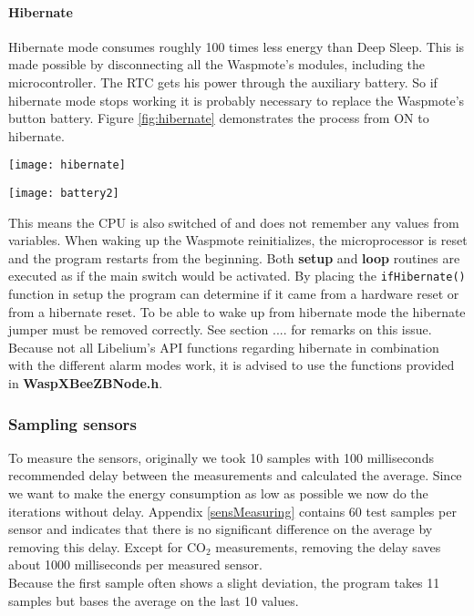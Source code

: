 \paragraph{Hibernate}
Hibernate mode consumes roughly 100 times less energy than Deep Sleep. This is made possible by disconnecting all the Waspmote's modules, including the microcontroller. The RTC gets his power through the auxiliary battery. So if hibernate mode stops working it is probably necessary to replace the Waspmote's button battery. Figure \ref{fig:hibernate} demonstrates the process from ON to hibernate.\\
\begin{figure*}[ht]
\centering
\texttt{[image: hibernate]}
\caption{Waspmote going from ON to Hibernate}
\label{fig:hibernate}
\end{figure*}
\begin{figure*}[!ht]
\centering
\texttt{[image: battery2]}
\caption{Battery life High Performance vs. Power Saver}
\label{fig:batCalcPS}
\end{figure*}
This means the CPU is also switched of and does not remember any values from variables. When waking up the Waspmote reinitializes, the microprocessor is reset and the program restarts from the beginning. Both \textbf{setup} and \textbf{loop} routines are executed as if the main switch would be activated. By placing the \verb+ifHibernate()+ function in setup the program can determine if it came from a hardware reset or from a hibernate reset. To be able to wake up from hibernate mode the hibernate jumper must be removed correctly. See section .... for remarks on this issue. \\Because not all Libelium's API functions regarding hibernate in combination with the different alarm modes work, it is advised to use the functions provided in \textbf{WaspXBeeZBNode.h}. 
\subsubsection{Sampling sensors}
To measure the sensors, originally we took 10 samples with 100 milliseconds recommended delay between the measurements and calculated the average. Since we want to make the energy consumption as low as possible we now do the iterations without delay. Appendix \ref{sensMeasuring} contains 60 test samples per sensor and indicates that there is no significant difference on the average by removing this delay. Except for CO$_{2}$ measurements, removing the delay saves about 1000 milliseconds per measured sensor.\\ 
Because the first sample often shows a slight deviation, the program takes 11 samples but bases the average on the last 10 values.
